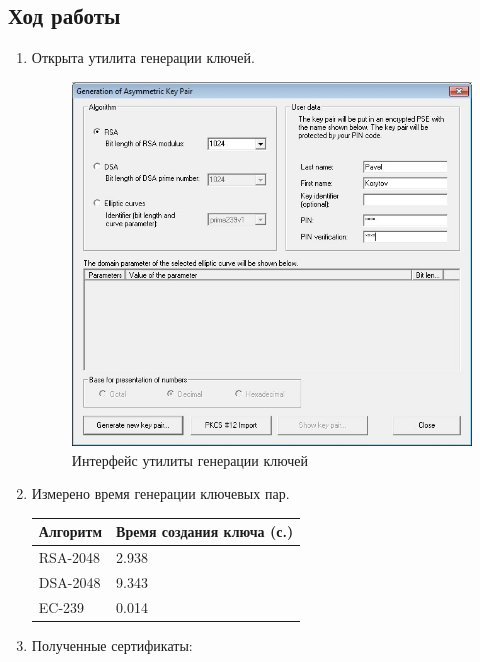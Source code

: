 \documentclass[a4paper, 14pt]{extarticle}
\begin{document}
\subsection{Ход работы}
\begin{enumerate}
    \item Открыта утилита генерации ключей.
        \begin{figure}[h]
            \centering
            \includegraphics[width=\textwidth]{img/S001.jpg}
            \caption{Интерфейс утилиты генерации ключей}%
            \label{img:1:1}
        \end{figure}
    \item Измерено время генерации ключевых пар.
        \begin{table}[h]
            \centering
            \begin{tabular}{@{}ll@{}}
                \toprule
                \textbf{Алгоритм} & \textbf{Время создания ключа} (с.) \\ \midrule
                RSA-2048 & 2.938                     \\
                DSA-2048 & 9.343                     \\
                EC-239   & 0.014                     \\ \bottomrule
            \end{tabular}
        \end{table}
        \FloatBarrier{}
    \item Полученные сертификаты:

\end{enumerate}
\end{document}
